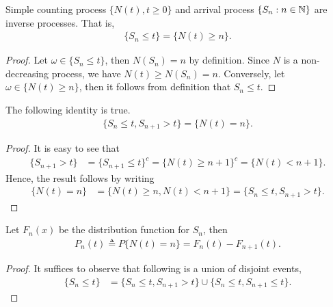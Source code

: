 \documentclass[a4paper,10pt,english]{article}
\begin{document}
\begin{lem} Simple counting process $\{N(t), t \geqslant 0\}$ and arrival process $\{S_n: n \in \mathbb{N}\}$ are inverse processes. That is,
\begin{align*}
\{S_n \leqslant t\} = \{N(t) \geqslant n\}.
\end{align*}
\end{lem}
\begin{proof} Let $\omega \in \{S_n \leqslant t\}$, then $N(S_n) = n$ by definition. 
Since $N$ is a non-decreasing process, we have $N(t) \geq N(S_n) = n$. 
Conversely, let $\omega \in \{N(t) \geqslant n\}$, then it follows from definition that $S_n \leq t$.
\end{proof}

\begin{cor} The following identity is true.
\begin{align*}
\{S_n \leqslant t, S_{n+1} > t\} = \{N(t) = n\}.
\end{align*}
\end{cor}
\begin{proof}
It is easy to see that 
\begin{align*}
\{S_{n+1} > t \} &= \{S_{n+1} \leqslant t\}^c = \{N(t) \geqslant n+1\}^c = \{N(t) < n+1\}.
\end{align*}
Hence, the result follows by writing 
\begin{align*}
\{N(t) = n\} &= \{N(t) \geqslant n, N(t) < n+1\} = \{S_n \leqslant t, S_{n+1} > t\}.
\end{align*}
\end{proof}

\begin{lem}
Let $F_n(x)$ be the distribution function for $S_n$, then 
\begin{align*}
P_n(t) \triangleq P\{N(t) = n\} = F_{n}(t)-F_{n+1}(t).
\end{align*}
\end{lem}
\begin{proof} It suffices to observe that following is a union of disjoint events,
\begin{align*}
\{S_n \leqslant t \} &= \{S_n \leqslant t, S_{n+1} > t\} \cup \{S_{n} \leqslant t, S_{n+1} \leqslant t\}.
\end{align*}
\end{proof}
\end{document}

